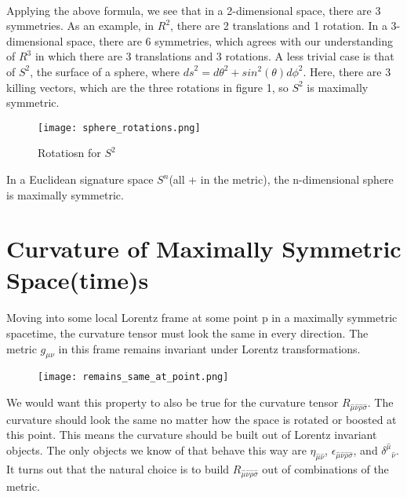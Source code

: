 \documentclass[10pt]{article}
\begin{document}
     \paragraph{}Applying the above formula, we see that in a 2-dimensional space, there are 3 symmetries. As an example, in ${R}^{2}$, there are 2 translations and 1 rotation. In a 3-dimensional space, there are 6 symmetries, which agrees with our understanding of ${R}^{3}$ in which there are 3 translations and 3 rotations. A less trivial case is that of ${S}^{2}$, the surface of a sphere, where ${ds}^{2} = {d\theta}^{2} + {sin}^{2}(\theta){d\phi}^{2}$. Here, there are 3 killing vectors, which are the three rotations in figure 1, so ${S}^{2}$ is maximally symmetric.
     
      \begin{figure}[h]
         \centering
         \texttt{[image: sphere\_rotations.png]}
         \caption{Rotatiosn for ${S}^{2}$}
         \label{fig:my_label}
     \end{figure}
     
     In a Euclidean signature space ${S}^{n}$(all + in the metric), the n-dimensional sphere is maximally symmetric.  
     
     \section{Curvature of Maximally Symmetric Space(time)s}
     \paragraph{}Moving into some local Lorentz frame at some point p in a maximally symmetric spacetime, the curvature tensor must look the same in every direction. The metric ${g}_{\mu\nu}$ in this frame remains invariant under Lorentz transformations.
     
      \begin{figure}[h]
         \centering
         \texttt{[image: remains\_same\_at\_point.png]}
         \label{fig:my_label}
     \end{figure}
     
     We would want this property to also be true for the curvature tensor ${R}_{\hat{\mu}\hat{\nu}\hat{\rho}\hat{\sigma}}$. The curvature should look the same no matter how the space is rotated or boosted at this point. This means the curvature should be built out of Lorentz invariant objects. The only objects we know of that behave this way are ${\eta}_{\hat{\mu}\hat{\nu}}$, ${\epsilon}_{\hat{\mu}\hat{\nu}\hat{\rho}\hat{\sigma}}$, and ${{\delta}^{\hat{\mu}}}_{\hat{\nu}}$. It turns out that the natural choice is to build ${R}_{\hat{\mu}\hat{\nu}\hat{\rho}\hat{\sigma}}$ out of combinations of the metric. 
     
\end{document}
